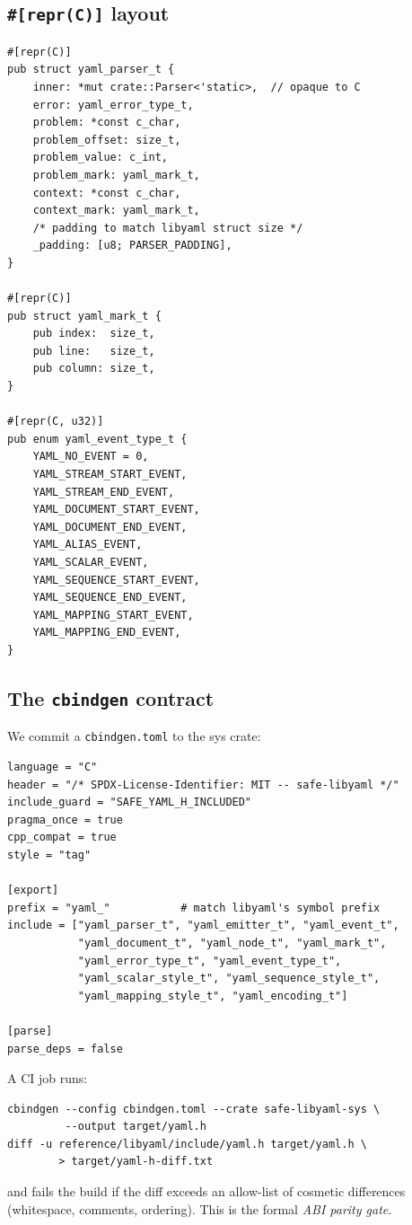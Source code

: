 \documentclass[12pt]{article}
\theoremstyle{definition}
\theoremstyle{remark}
\begin{document}
\subsection{\texttt{\#[repr(C)]} layout}

\begin{lstlisting}
#[repr(C)]
pub struct yaml_parser_t {
    inner: *mut crate::Parser<'static>,  // opaque to C
    error: yaml_error_type_t,
    problem: *const c_char,
    problem_offset: size_t,
    problem_value: c_int,
    problem_mark: yaml_mark_t,
    context: *const c_char,
    context_mark: yaml_mark_t,
    /* padding to match libyaml struct size */
    _padding: [u8; PARSER_PADDING],
}

#[repr(C)]
pub struct yaml_mark_t {
    pub index:  size_t,
    pub line:   size_t,
    pub column: size_t,
}

#[repr(C, u32)]
pub enum yaml_event_type_t {
    YAML_NO_EVENT = 0,
    YAML_STREAM_START_EVENT,
    YAML_STREAM_END_EVENT,
    YAML_DOCUMENT_START_EVENT,
    YAML_DOCUMENT_END_EVENT,
    YAML_ALIAS_EVENT,
    YAML_SCALAR_EVENT,
    YAML_SEQUENCE_START_EVENT,
    YAML_SEQUENCE_END_EVENT,
    YAML_MAPPING_START_EVENT,
    YAML_MAPPING_END_EVENT,
}
\end{lstlisting}

\subsection{The \texttt{cbindgen} contract}

We commit a \texttt{cbindgen.toml} to the sys crate:

\begin{lstlisting}[language={}]
language = "C"
header = "/* SPDX-License-Identifier: MIT -- safe-libyaml */"
include_guard = "SAFE_YAML_H_INCLUDED"
pragma_once = true
cpp_compat = true
style = "tag"

[export]
prefix = "yaml_"           # match libyaml's symbol prefix
include = ["yaml_parser_t", "yaml_emitter_t", "yaml_event_t",
           "yaml_document_t", "yaml_node_t", "yaml_mark_t",
           "yaml_error_type_t", "yaml_event_type_t",
           "yaml_scalar_style_t", "yaml_sequence_style_t",
           "yaml_mapping_style_t", "yaml_encoding_t"]

[parse]
parse_deps = false
\end{lstlisting}

A CI job runs:
\begin{lstlisting}[language={}]
cbindgen --config cbindgen.toml --crate safe-libyaml-sys \
         --output target/yaml.h
diff -u reference/libyaml/include/yaml.h target/yaml.h \
        > target/yaml-h-diff.txt
\end{lstlisting}
and fails the build if the diff exceeds an allow-list of cosmetic
differences (whitespace, comments, ordering). This is the formal
\emph{ABI parity gate}.
\end{document}
